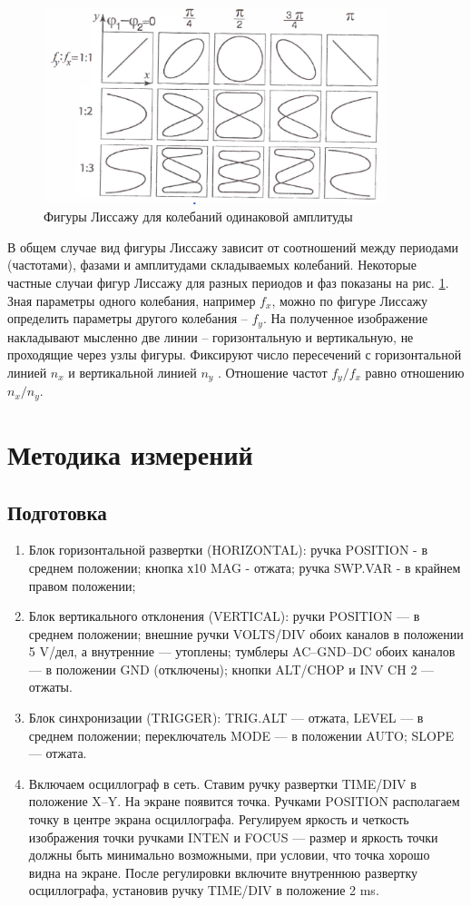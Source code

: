 \documentclass[a4paper,12pt]{article} %
\begin{document}
	\begin{figure}
		\includegraphics[width=10cm]{l_prim.png}
		\caption{Фигуры Лиссажу для колебаний одинаковой амплитуды}
		\label{l_prim}
	\end{figure}
	
	В общем случае вид фигуры Лиссажу зависит от соотношений между периодами (частотами), фазами и амплитудами складываемых колебаний. Некоторые частные случаи фигур Лиссажу для разных периодов и фаз показаны на рис. \ref{l_prim}. Зная параметры одного колебания, 
	например $ f_x $, можно по фигуре Лиссажу определить параметры другого колебания -- $ f_y $. На полученное изображение накладывают мысленно две линии -- горизонтальную и вертикальную, не проходящие через узлы фигуры. Фиксируют число пересечений с горизонтальной линией $ n_x $ и вертикальной линией $ n_y $ . Отношение частот $ f_y/f_x $ равно отношению $ n_x/n_y $. 
	

	\section{Методика измерений}
	\subsection{Подготовка}
	\begin{enumerate}
		\item    Блок горизонтальной развертки (HORIZONTAL): ручка POSITION -  в среднем положении; кнопка х10 MAG - отжата; ручка SWP.VAR - в крайнем правом положении;
		\item    Блок вертикального отклонения (VERTICAL): ручки POSITION — в среднем положении; внешние ручки VOLTS/DIV обоих каналов в положении 5 V/дел, а внутренние — утоплены; тумблеры AC–GND–DC обоих каналов — в положении GND (отключены); кнопки ALT/CHOP и INV CH 2 — отжаты.
		\item    Блок синхронизации (TRIGGER): TRIG.ALT — отжата, LEVEL — в среднем положении; переключатель MODE — в положении AUTO; SLOPE — отжата.
		\item    Включаем осциллограф в сеть. Ставим ручку развертки
		TIME/DIV в положение X–Y. На экране появится точка. Ручками POSITION располагаем точку в центре экрана осциллографа. Регулируем яркость и четкость изображения точки ручками INTEN и FOCUS — размер и яркость точки должны быть минимально возможными, при условии, что точка хорошо видна на экране. После регулировки включите внутреннюю развертку осциллографа, установив ручку TIME/DIV в положение 2 ms.	
	\end{enumerate}
\end{document}
